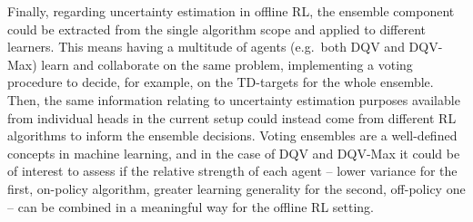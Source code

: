 Finally, regarding uncertainty estimation in offline RL, the ensemble
component could be extracted from the single algorithm scope and
applied to different learners. This means having a multitude of agents
(e.g.\ both DQV and DQV-Max) learn and collaborate on the same
problem, implementing a voting procedure to decide, for example, on
the TD-targets for the whole ensemble. Then, the same information
relating to uncertainty estimation purposes available from individual
heads in the current setup could instead come from different RL
algorithms to inform the ensemble decisions. Voting ensembles are a
well-defined concepts in machine learning, and in the case of DQV and
DQV-Max it could be of interest to assess if the relative strength of
each agent -- lower variance for the first, on-policy algorithm,
greater learning generality for the second, off-policy one -- can be
combined in a meaningful way for the offline RL setting.
